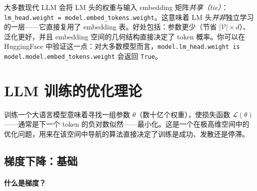 \begin{intuitionbox}[权重共享：LM 头 = embedding 矩阵的转置]
大多数现代 LLM 会将 LM 头的权重与输入 embedding 矩阵\emph{共享（tie）}：\texttt{lm\_head.weight = model.embed\_tokens.weight}。这意味着 LM 头\emph{并非}独立学习的一层——它直接复用了 embedding 表。好处包括：参数更少（节省 $|\mathcal{V}| \times d$）、泛化更好，并且 embedding 空间的几何结构直接决定了 token 概率。你可以在 HuggingFace 中验证这一点：对大多数模型而言，\texttt{model.lm\_head.weight is model.model.embed\_tokens.weight} 会返回 \texttt{True}。
\end{intuitionbox}

\newpage
\section{LLM 训练的优化理论}
\label{optimization-theory-for-llm-training}

训练一个大语言模型意味着寻找一组参数 $\theta$（数十亿个权重），使损失函数 $\mathcal{L}(\theta)$ ——通常是下一个 token 的负对数似然——最小化。这是一个在极高维空间中的优化问题，用来在该空间中导航的算法直接决定了训练是成功、发散还是停滞。

\subsection{梯度下降：基础}
\label{gradient-descent-the-foundation}

\paragraph{什么是梯度？}
\label{what-is-a-gradient}

